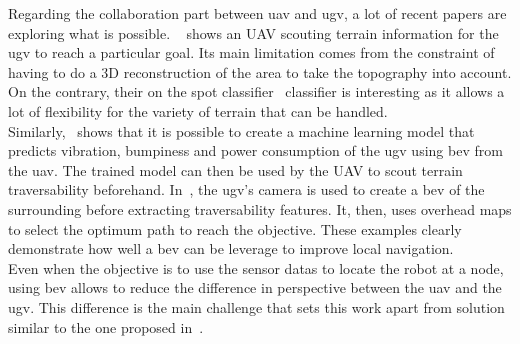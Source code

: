 Regarding the collaboration part between \gls{uav} and \gls{ugv}, a lot of recent papers are exploring what is possible.
~\cite{delmerico_active_2017} shows an UAV scouting terrain information for the \gls{ugv} to reach a particular goal.
Its main limitation comes from the constraint of having to do a 3D reconstruction of the area to take the topography
into account.
On the contrary, their on the spot classifier~\parencite{kulic_--spot_2017} classifier is interesting as it allows
a lot of flexibility for the variety of terrain that can be handled.\\
Similarly,~\cite{fortin_uav-assisted_2024} shows that it is possible to create a machine learning model that predicts
vibration, bumpiness and power consumption of the \gls{ugv} using \gls{bev} from the \gls{uav}.
The trained model can then be used by the UAV to scout terrain traversability beforehand.
In~\cite{zhang_dual-bev_2025}, the \gls{ugv}'s camera is used to create a \gls{bev} of the surrounding before extracting traversability features.
It, then, uses overhead maps to select the optimum path to reach the objective.
These examples clearly demonstrate how well a \gls{bev} can be leverage to improve local navigation.\\
Even when the objective is to use the sensor datas to locate the robot at a node, using \gls{bev} allows to reduce
the difference in perspective between the \gls{uav} and the \gls{ugv}.
This difference is the main challenge that sets this work apart from solution similar to the one proposed in~\cite{han_effective_2020}.




